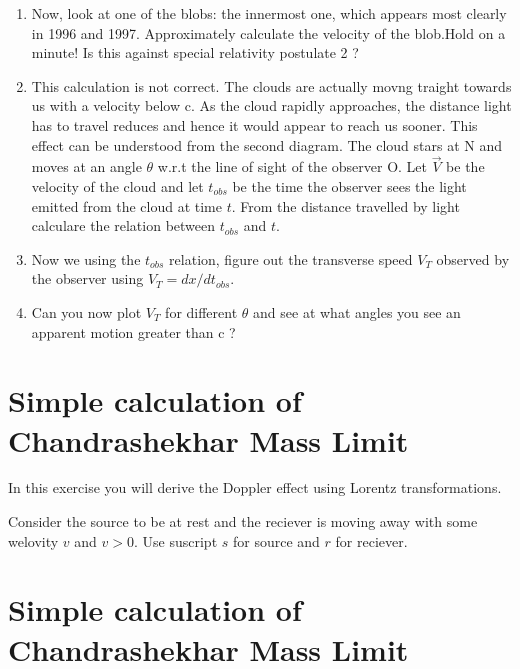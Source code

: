 \documentclass[10pt,a4paper]{article}
\begin{document}
\begin{enumerate}
 \item Now, look at one of the blobs: the innermost one, which appears most clearly in 1996 and 1997. Approximately calculate the velocity of the blob.Hold on a minute! Is this against special relativity postulate 2 ?
 \item This calculation is not correct. The clouds are actually movng traight towards us with a velocity below c. As the cloud rapidly approaches, the distance light has to travel reduces and hence it would appear to reach us sooner. This effect can be understood from the second diagram. The cloud stars at N and moves at an angle $\theta$ w.r.t the line of sight of the observer O. Let $\vec{V}$ be the velocity of the cloud and let $t_{obs}$ be the time the observer sees the light emitted from the cloud at time $t$. From the distance travelled by light calculare the  relation between $t_{obs}$ and $t$.
 

 
\item Now we using the $t_{obs}$ relation, figure out the transverse speed $V_{T}$ observed by the observer using $V_{T} = dx/d t_{obs}$. 
\item Can you now plot $V_{T}$ for different $\theta$ and see at what angles you see an apparent motion greater than c ?
 
 
\end{enumerate}



\section{Simple calculation of Chandrashekhar Mass Limit}

In this exercise you will derive the Doppler effect using Lorentz transformations. 

Consider the source to be at rest and the reciever is moving away with some welovity $v$ and $v>0$. Use suscript $s$ for source and $r$ for reciever.

\section{Simple calculation of Chandrashekhar Mass Limit}
\end{document}
